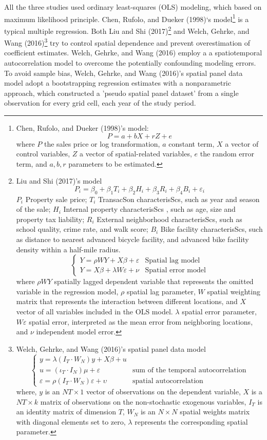 \documentclass[12pt,]{article}
\let\rmarkdownfootnote\footnote%
\def\footnote{\protect\rmarkdownfootnote}
\begin{document}
All the three studies used ordinary least-squares (OLS) modeling, which
based on maximum likelihood principle. Chen, Rufolo, and Dueker (1998)`s
model\footnote{Chen, Rufolo, and Dueker (1998)'s model:
  \[P=a+bX +rZ +e\] where \(P\) the sales price or log transformation,
  \(a\) constant term, \(X\) a vector of control variables, \(Z\) a
  vector of spatial-related variables, \(e\) the random error term, and
  \(a, b, r\) parameters to be estimated.} is a typical multiple
regression. Both Liu and Shi (2017)\footnote{Liu and Shi (2017)'s model
  \[P_i=\beta_0+\beta_1T_i+\beta_2H_i+\beta_3R_i+\beta_4B_i+\varepsilon_i\]
  \(P_i\) Property sale price; \(T_i\) TransacSon characterisScs, such
  as year and season of the sale; \(H_i\) Internal property
  characterisScs , such as age, size and property tax liability; \(R_i\)
  External neighborhood characterisScs, such as school quality, crime
  rate, and walk score; \(B_i\) Bike facility characterisScs, such as
  distance to nearest advanced bicycle facility, and advanced bike
  facility density within a half-mile radius.
  \[\begin{cases}Y=\rho W Y+X\beta+\varepsilon& \text{Spatial lag model}\\Y=X\beta+\lambda W\varepsilon+\nu& \text{Spatial error model} \end{cases}\]
  where \(\rho W Y\) spatially lagged dependent variable that represents
  the omitted variable in the regression model, \(\rho\) spatial lag
  parameter, \(W\) spatial weighting matrix that represents the
  interaction between different locations, and \(X\) vector of all
  variables included in the OLS model. \(\lambda\) spatial error
  parameter, \(W\varepsilon\) spatial error, interpreted as the mean
  error from neighboring locations, and \(\nu\) independent model error.}
and Welch, Gehrke, and Wang (2016)\footnote{Welch, Gehrke, and Wang
  (2016)'s spatial panel data model
  \[\begin{cases}y=\lambda(I_T\cdot W_N)y+X\beta+u\\u=(\iota_T\cdot I_N)\mu+\varepsilon&\text{sum of the temporal autocorrelation} \\\varepsilon=\rho(I_T\cdot W_N)\varepsilon+\upsilon&\text{spatial autocorrelation} \end{cases}\]
  where, \(y\) is an \(NT\times1\) vector of observations on the
  dependent variable, \(X\) is a \(NT\times k\) matrix of observations
  on the non-stochastic exogenous variables, \(I_T\) is an identity
  matrix of dimension \(T\), \(W_N\) is an \(N\times N\) spatial weights
  matrix with diagonal elements set to zero, \(\lambda\) represents the
  corresponding spatial parameter.} try to control spatial dependence
and prevent overestimation of coefficient estimates. Welch, Gehrke, and
Wang (2016) employ a a spatiotemporal autocorrelation model to overcome
the potentially confounding modeling errors. To avoid sample bias,
Welch, Gehrke, and Wang (2016)'s spatial panel data model adopt a
bootstrapping regression estimates with a nonparametric approach, which
constructed a 'pseudo spatial panel dataset' from a single observation
for every grid cell, each year of the study period.
\end{document}
